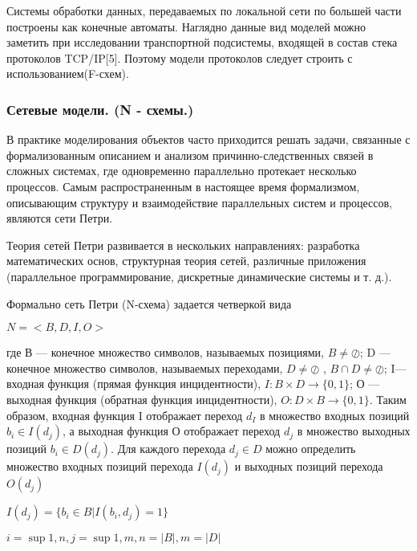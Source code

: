     Системы обработки данных, передаваемых по локальной сети по большей части построены как конечные автоматы. Наглядно данные вид моделей можно заметить при исследовании транспортной подсистемы, входящей в состав стека протоколов TCP/IP[5]. Поэтому модели протоколов следует строить с использованием(F-схем).

\subsubsection{Сетевые модели. (N - схемы.)}

  В практике моделирования объектов часто приходится решать задачи, связанные с формализованным описанием и анализом причинно-следственных связей в сложных системах, где одновременно параллельно протекает несколько процессов. Самым распространенным в настоящее время формализмом, описывающим структуру и взаимодействие параллельных систем и процессов, являются сети Петри.

  Теория сетей Петри развивается в нескольких направлениях: разработка математических основ, структурная теория сетей, различные приложения (параллельное программирование, дискретные динамические системы и т. д.).

  Формально сеть Петри (N-схема) задается четверкой вида

  \begin{center}
    $N = <B, D, I, O>$
  \end{center}

  где В — конечное множество символов, называемых позициями, $B \ne \oslash$; D — конечное множество символов, называемых переходами, $D \ne \oslash$ , $B \cap D \ne \oslash$; I—входная функция (прямая функция инцидентности), $I \colon B \times D\to \{0, 1\}$; О — выходная функция (обратная функция инцидентности), $O \colon D \times B \to \{0, 1\} $. Таким образом, входная функция I отображает переход $d_{I}$ в множество входных позиций $ b_{i} \in I(d_{j})$, а выходная функция О отображает переход $d_{j}$ в множество выходных позиций $b_{i} \in D(d_{j})$. Для каждого перехода $d_{j} \in D$ можно определить множество входных позиций перехода $I(d_{j})$ и выходных позиций перехода $O(d_{j})$

  \begin{center}
    $I(d_{j}) = \{b_{i} \in B|I(b_{i}, d_{j}) = 1\}$
  \end{center}

  \begin{center}
    $i = \sup{1,n}, j = \sup{1, m}, n = |B|, m = |D|$
  \end{center}


